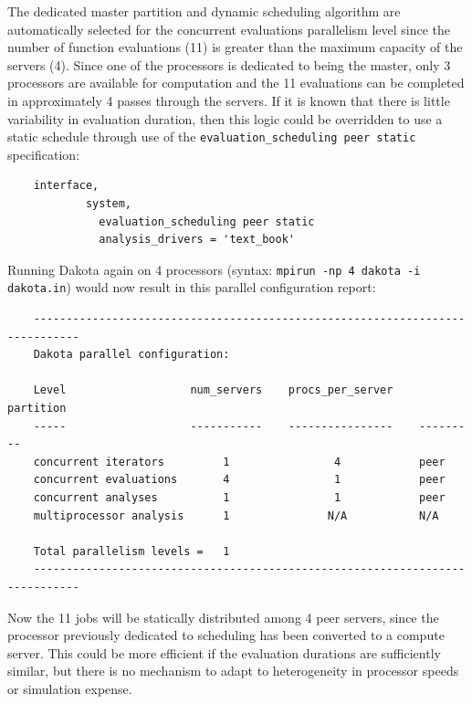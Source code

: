 The dedicated master partition and dynamic scheduling algorithm are
automatically selected for the concurrent evaluations parallelism
level since the number of function evaluations (11) is greater than
the maximum capacity of the servers (4). Since one of the processors
is dedicated to being the master, only 3 processors are available for
computation and the 11 evaluations can be completed in approximately 4
passes through the servers. If it is known that there is little
variability in evaluation duration, then this logic could be
overridden to use a static schedule through use of the
\texttt{evaluation\_scheduling peer static} specification:
\begin{small}
\begin{verbatim}
    interface,
            system,
              evaluation_scheduling peer static
              analysis_drivers = 'text_book'
\end{verbatim}
\end{small}

Running Dakota again on 4 processors (syntax: \texttt{mpirun -np 4
  dakota -i dakota.in}) would now result in this parallel
configuration report:
\begin{small}
\begin{verbatim}
    -----------------------------------------------------------------------------
    Dakota parallel configuration:

    Level                   num_servers    procs_per_server    partition
    -----                   -----------    ----------------    ---------
    concurrent iterators         1                4            peer
    concurrent evaluations       4                1            peer
    concurrent analyses          1                1            peer
    multiprocessor analysis      1               N/A           N/A

    Total parallelism levels =   1
    -----------------------------------------------------------------------------
\end{verbatim}
\end{small}

Now the 11 jobs will be statically distributed among 4 peer servers,
since the processor previously dedicated to scheduling has been
converted to a compute server. This could be more efficient if the
evaluation durations are sufficiently similar, but there is no
mechanism to adapt to heterogeneity in processor speeds or simulation
expense.

